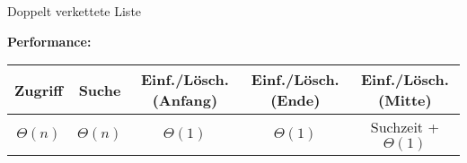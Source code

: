 \begin{defi}{Doppelt verkettete Liste}
\begin{center}
    \end{center}

    \textbf{Performance:}

    \begin{center}
        \begin{tabular}{c|c|c|c|c}
            Zugriff     & Suche       & Einf./Lösch. (Anfang) & Einf./Lösch. (Ende) & Einf./Lösch. (Mitte)   \\
            \hline
            $\Theta(n)$ & $\Theta(n)$ & $\Theta(1)$           & $\Theta(1)$         & Suchzeit + $\Theta(1)$ \\
        \end{tabular}
    \end{center}
\end{defi}

